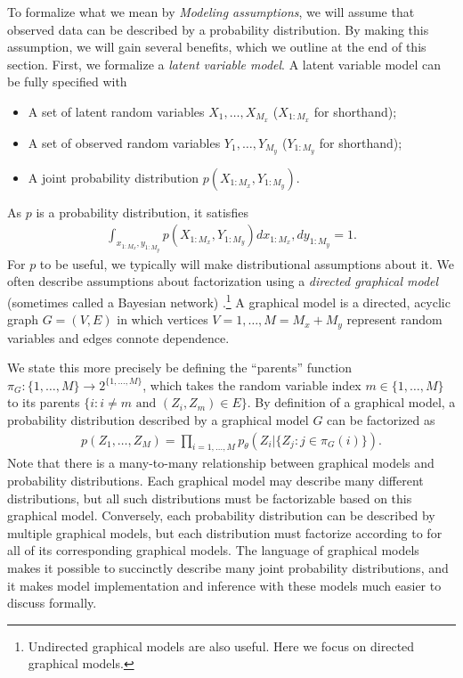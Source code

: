 To formalize what we mean by \emph{Modeling assumptions}, we will
assume that observed data can be described by a probability
distribution.  By making this assumption, we will gain several
benefits, which we outline at the end of this section.  First, we
formalize a \emph{latent variable model}.  A latent variable model can
be fully specified with
\begin{itemize}
  \item A set of latent random variables $X_1, \ldots, X_{M_x}$ ($X_{1:M_x}$ for shorthand);
  \item A set of observed random variables $Y_1, \ldots, Y_{M_y}$ ($Y_{1:M_y}$ for shorthand);
  \item A joint probability distribution $p(X_{1:M_x}, Y_{1:M_y})$.
\end{itemize}
 As $p$ is a probability distribution, it satisfies
\begin{align*}
  \int_{x_{1:M_x}, y_{1:M_y}} p(X_{1:M_x}, Y_{1:M_y}) d x_{1:M_x}, d
  y_{1:M_y} = 1.
\end{align*}  
For $p$ to be useful, we typically will make distributional
assumptions about it.  We often describe assumptions about
factorization using a \emph{directed graphical model} (sometimes
called a Bayesian network) \citep{pearl:1985}.\footnote{Undirected
  graphical models are also useful.  Here we focus on directed
  graphical models.}  A graphical model is a directed, acyclic graph
$G = (V, E)$ in which vertices $V=1, \ldots, M = M_x + M_y$ represent
random variables and edges connote dependence.

We state this more precisely be defining the ``parents'' function
$\pi_G : \{ 1, \ldots, M \} \rightarrow 2^{\{ 1, \ldots, M \}}$, which
takes the random variable index $m \in \{1, \ldots, M\}$ to its
parents $\{ i : i \neq m \mbox{ and } (Z_i, Z_m) \in E \}$.  By
definition of a graphical model, a probability distribution described
by a graphical model $G$ can be factorized as
\begin{align}
  p(Z_1, \ldots, Z_M) = \prod_{i=1, \ldots, M} p_\theta(Z_i |
  \{ Z_j : j \in \pi_G(i) \} ).
\label{eq:gm_definition}
\end{align}
Note that there is a many-to-many relationship between graphical
models and probability distributions. Each graphical model may
describe many different distributions, but all such distributions must
be factorizable based on this graphical model.  Conversely, each
probability distribution can be described by multiple graphical
models, but each distribution must factorize according to
 for all of its corresponding graphical
models. The language of graphical models makes it possible to
succinctly describe many joint probability distributions, and it makes
model implementation and inference with these models much easier to
discuss formally.


